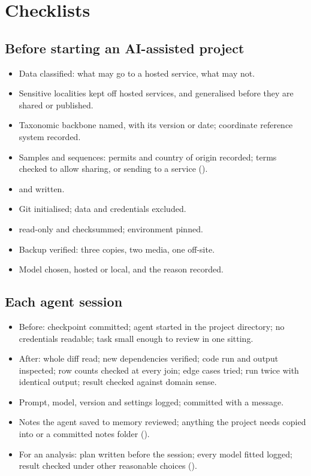 \chapter{Checklists}
\label{app:checklists}

\section{Before starting an AI-assisted project}

\begin{itemize}[label=$\square$]
  \item Data classified: what may go to a hosted service, what may not.
  \item Sensitive localities kept off hosted services, and generalised before
    they are shared or published.
  \item Taxonomic backbone named, with its version or date; coordinate
    reference system recorded.
  \item Samples and sequences: permits and country of origin recorded; terms
    checked to allow sharing, or sending to a service ().
  \item {} and  written.
  \item Git initialised; data and credentials excluded.
  \item {} read-only and checksummed; environment pinned.
  \item Backup verified: three copies, two media, one off-site.
  \item Model chosen, hosted or local, and the reason recorded.
\end{itemize}

\section{Each agent session}

\begin{itemize}[label=$\square$]
  \item Before: checkpoint committed; agent started in the project directory; no
    credentials readable; task small enough to review in one sitting.
  \item After: whole diff read; new dependencies verified; code run and output
    inspected; row counts checked at every join; edge cases tried; run twice
    with identical output; result checked against domain sense.
  \item Prompt, model, version and settings logged; committed with a message.
  \item Notes the agent saved to memory reviewed; anything the project needs
    copied into  or a committed notes folder
    ().
  \item For an analysis: plan written before the session; every model fitted
    logged; result checked under other reasonable choices
    ().
\end{itemize}

